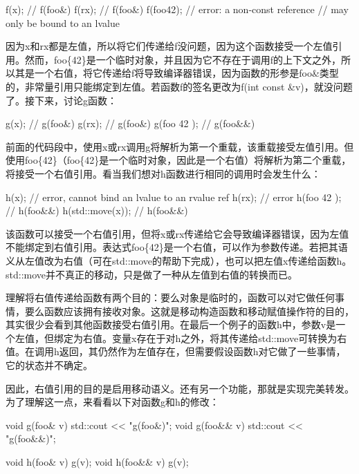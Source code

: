 \begin{cppcode}
f(x); // f(foo&)
f(rx); // f(foo&)
f(foo{42}); // error: a non-const reference
            // may only be bound to an lvalue
\end{cppcode}

因为x和rx都是左值，所以将它们传递给f没问题，因为这个函数接受一个左值引用。然而，foo\{42\}是一个临时对象，并且因为它不存在于调用f的上下文之外，所以其是一个右值，将它传递给f将导致编译器错误，因为函数的形参是foo\&类型的，非常量引用只能绑定到左值。若函数f的签名更改为f(int const \&v)，就没问题了。接下来，讨论g函数：

\begin{cppcode}
g(x); // g(foo&)
g(rx); // g(foo&)
g(foo{ 42 }); // g(foo&&)
\end{cppcode}

前面的代码段中，使用x或rx调用g将解析为第一个重载，该重载接受左值引用。但使用foo\{42\}（foo\{42\}是一个临时对象，因此是一个右值）将解析为第二个重载，将接受一个右值引用。看当我们想对h函数进行相同的调用时会发生什么：

\begin{cppcode}
h(x); // error, cannot bind an lvalue to an rvalue ref
h(rx); // error
h(foo{ 42 }); // h(foo&&)
h(std::move(x)); // h(foo&&)
\end{cppcode}

该函数可以接受一个右值引用，但将x或rx传递给它会导致编译器错误，因为左值不能绑定到右值引用。表达式foo\{42\}是一个右值，可以作为参数传递。若把其语义从左值改为右值（可在std::move的帮助下完成），也可以把左值x传递给函数h。std::move并不真正的移动，只是做了一种从左值到右值的转换而已。

理解将右值传递给函数有两个目的：要么对象是临时的，函数可以对它做任何事情，要么函数应该拥有接收对象。这就是移动构造函数和移动赋值操作符的目的，其实很少会看到其他函数接受右值引用。在最后一个例子的函数h中，参数v是一个左值，但绑定为右值。变量x存在于对h之外，将其传递给std::move可转换为右值。在调用h返回，其仍然作为左值存在，但需要假设函数h对它做了一些事情，它的状态并不确定。

因此，右值引用的目的是启用移动语义。还有另一个功能，那就是实现完美转发。为了理解这一点，来看看以下对函数g和h的修改：

\begin{cppcode}
void g(foo& v) { std::cout << "g(foo&)\n"; }
void g(foo&& v) { std::cout << "g(foo&&)\n"; }

void h(foo& v) { g(v); }
void h(foo&& v) { g(v); }
\end{cppcode}

